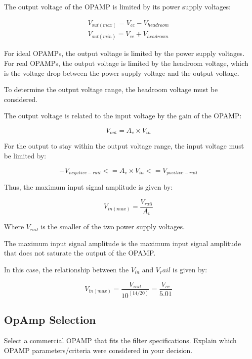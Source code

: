 The output voltage of the OPAMP is limited by its power supply voltages:

\begin{equation}
    \begin{aligned}
        V_{out(max)} = V_{cc} - V_{headroom} \\
        V_{out(min)} = V_{ee} + V_{headroom}
    \end{aligned}
\end{equation}

For ideal OPAMPs, the output voltage is limited by the power supply voltages. For real OPAMPs, the output voltage is limited by the headroom voltage, which is the voltage drop between the power supply voltage and the output voltage. 

To determine the output voltage range, the headroom voltage must be considered. 

The output voltage is related to the input voltage by the gain of the OPAMP:

\begin{equation}
    V_{out} = A_v \times V_{in}
\end{equation}

For the output to stay within the output voltage range, the input voltage must be limited by:

\begin{equation}
    -V_{negative-rail} <= A_v \times V_{in} <= V_{positive-rail}
\end{equation}

Thus, the maximum input signal amplitude is given by:

\begin{equation}
    V_{in(max)} = \frac{V_{rail}}{A_v}
\end{equation}

Where $V_{rail}$ is the smaller of the two power supply voltages.

The maximum input signal amplitude is the maximum input signal amplitude that does not saturate the output of the OPAMP.

In this case, the relationship between the $V_{in}$ and $V_rail$ is given by:

\begin{equation}
    V_{in(max)} = \frac{V_{rail}}{10^{(14/20)}} = \frac{V_{cc}}{5.01}
\end{equation}

\subsection{OpAmp Selection}
Select a commercial OPAMP that fits the filter specifications. Explain which OPAMP
parameters/criteria were considered in your decision. 

